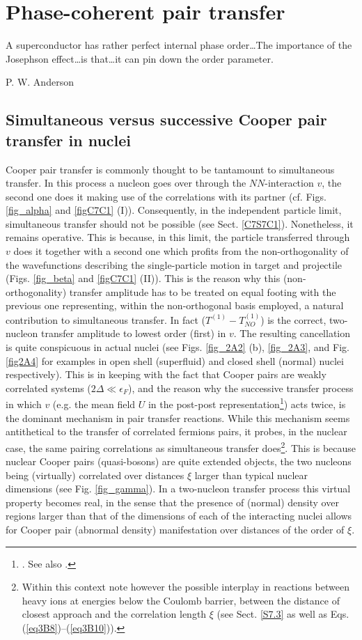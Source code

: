 \chapter{Phase-coherent pair transfer}\label{chapter2}
 \epigraph{A superconductor has rather perfect internal phase order\dots The importance of the Josephson effect\dots is that\dots it can pin down the order parameter.}{P. W. Anderson}
\section{Simultaneous versus successive Cooper pair transfer in nuclei}\label{C2S1}
Cooper pair transfer is commonly thought to be tantamount to simultaneous transfer. In this process a nucleon goes over through the $NN$-interaction $v$, the second one does it making use of the correlations with its partner (cf. Figs. \ref{fig_alpha} and \ref{figC7C1} (I)). Consequently, in the independent particle limit, simultaneous  transfer should not be possible (see Sect. \ref{C7S7C1}). Nonetheless, it remains operative. This is because, in this limit, the particle transferred through $v$ does it together with a second one which profits from the non-orthogonality of the wavefunctions describing the single-particle motion in target and projectile (Figs. \ref{fig_beta} and \ref{figC7C1} (II)). This is the reason why this (non-orthogonality) transfer amplitude has to be treated on equal footing with  the previous one  representing, within the non-orthogonal basis employed, a natural contribution to simultaneous transfer. In fact ($T^{(1)}-T^{(1)}_{NO}$) is the correct,  two-nucleon transfer amplitude to lowest order (first) in $v$. The resulting cancellation is quite conspicuous in actual nuclei  (see Figs. \ref{fig_2A2} (b), \ref{fig_2A3}, and Fig. \ref{fig2A4} for examples in open shell (superfluid) and closed shell (normal) nuclei respectively). This is in keeping with the fact that Cooper pairs are weakly correlated systems ($2\Delta\ll\epsilon_F$), and the reason why the successive transfer process in which $v$ (e.g.  the mean field $U$ in the post-post representation\footnote{\cite{Bayman:82,Potel:13}.  See also \cite{Pinkston:82}.}) acts twice, is the dominant mechanism in pair transfer reactions. While this mechanism seems antithetical to the transfer of  correlated fermions pairs, it probes, in the nuclear case, the same pairing correlations as simultaneous transfer does\footnote{Within this context note however the possible interplay in reactions between heavy ions at energies below the Coulomb barrier, between the distance of closest approach and the correlation length $\xi$ (see Sect. \ref{S7.3} as well as Eqs. (\ref{eq3B8})--(\ref{eq3B10})).}. This is because nuclear Cooper pairs (quasi-bosons) are quite extended objects, the two nucleons being (virtually) correlated over distances $\xi$   larger than typical nuclear dimensions (see Fig. \ref{fig_gamma}). In a two-nucleon transfer process this virtual property becomes real, in the sense that the presence of (normal) density over regions larger than that of the dimensions of each of the interacting nuclei allows for  Cooper pair (abnormal density) manifestation over distances of the order of $\xi$.



